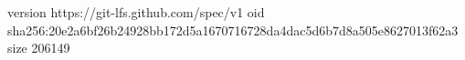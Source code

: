 version https://git-lfs.github.com/spec/v1
oid sha256:20e2a6bf26b24928bb172d5a1670716728da4dac5d6b7d8a505e8627013f62a3
size 206149
